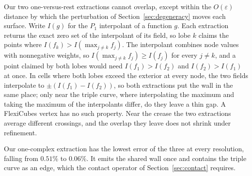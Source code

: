\documentclass[11pt]{article}
\theoremstyle{definition}
\begin{document}
Our two one-versus-rest extractions cannot overlap, except within the $O(\varepsilon)$ distance by which
the perturbation of Section~\ref{sec:degeneracy} moves each surface. Write $I(g)$ for the $P_1$ interpolant of a function $g$. Each extraction
returns the exact zero set of the interpolant of its field, so lobe $k$
claims the points where $I(f_k) > I(\max_{j\neq k} f_j)$. The interpolant
combines node values with nonnegative weights, so
$I(\max_{j\neq k} f_j) \ge I(f_j)$ for every $j \neq k$, and a point claimed
by both lobes would need $I(f_1) > I(f_2)$ and $I(f_2) > I(f_1)$ at once. In
cells where both lobes exceed the exterior at every node, the two fields
interpolate to $\pm(I(f_1) - I(f_2))$, so both extractions put the wall in
the same place; only near the triple curve, where interpolating the maximum
and taking the maximum of the interpolants differ, do they leave a thin gap.
A FlexiCubes vertex has no such property. Near the crease the two
extractions average different crossings, and the overlap they leave does not
shrink under refinement.

Our one-complex extraction has the lowest error of the three at every
resolution, falling from $0.51\%$ to $0.06\%$. It emits the shared wall once
and contains the triple curve as an edge, which the contact operator of
Section~\ref{sec:contact} requires.
\end{document}
